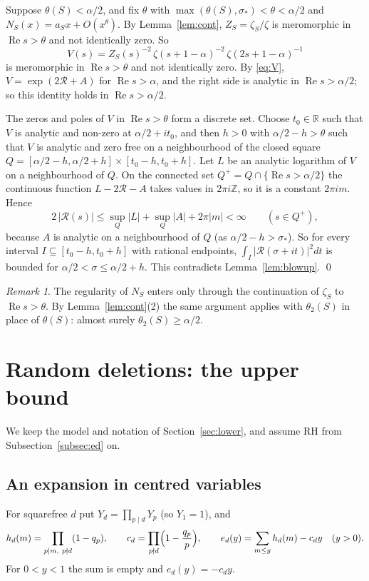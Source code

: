 \documentclass[11pt]{amsart}
\theoremstyle{remark}
\newtheorem{remark}[lemma]{Remark}
\numberwithin{equation}{section}
\newcommand{\R}{\mathbb{R}}
\newcommand{\Z}{\mathbb{Z}}
\newcommand{\cR}{\mathcal{R}}
\DeclareMathOperator{\re}{Re}
\begin{document}
Suppose $\theta(S)<\alpha/2$, and fix $\theta$ with $\max(\theta(S),\sigma_*)<\theta<\alpha/2$ and $N_S(x)=a_Sx+O(x^{\theta})$. By Lemma~\ref{lem:cont}, $Z_S=\zeta_S/\zeta$ is meromorphic in $\re s>\theta$ and not identically zero. So
\[
V(s)=Z_S(s)^{-2}\,\zeta(s+1-\alpha)^{-2}\,\zeta(2s+1-\alpha)^{-1}
\]
is meromorphic in $\re s>\theta$ and not identically zero. By \eqref{eq:V}, $V=\exp(2\cR+A)$ for $\re s>\alpha$, and the right side is analytic in $\re s>\alpha/2$; so this identity holds in $\re s>\alpha/2$.

The zeros and poles of $V$ in $\re s>\theta$ form a discrete set. Choose $t_0\in\R$ such that $V$ is analytic and non-zero at $\alpha/2+it_0$, and then $h>0$ with $\alpha/2-h>\theta$ such that $V$ is analytic and zero free on a neighbourhood of the closed square $Q=[\alpha/2-h,\alpha/2+h]\times[t_0-h,t_0+h]$. Let $L$ be an analytic logarithm of $V$ on a neighbourhood of $Q$. On the connected set $Q^+=Q\cap\{\re s>\alpha/2\}$ the continuous function $L-2\cR-A$ takes values in $2\pi i\Z$, so it is a constant $2\pi im$. Hence
\[
2\,|\cR(s)|\le\sup_Q|L|+\sup_Q|A|+2\pi|m|<\infty\qquad(s\in Q^+),
\]
because $A$ is analytic on a neighbourhood of $Q$ (as $\alpha/2-h>\sigma_*$). So for every interval $I\subseteq[t_0-h,t_0+h]$ with rational endpoints, $\int_I|\cR(\sigma+it)|^2dt$ is bounded for $\alpha/2<\sigma\le\alpha/2+h$. This contradicts Lemma~\ref{lem:blowup}. \qed

\begin{remark}\label{rem:lowertwo}
The regularity of $N_S$ enters only through the continuation of $\zeta_S$ to $\re s>\theta$. By Lemma~\ref{lem:cont}(2) the same argument applies with $\theta_2(S)$ in place of $\theta(S)$: almost surely $\theta_2(S)\ge\alpha/2$.
\end{remark}

\section{Random deletions: the upper bound}\label{sec:upper}

We keep the model and notation of Section~\ref{sec:lower}, and assume RH from Subsection~\ref{subsec:ed} on.

\subsection{An expansion in centred variables}
For squarefree $d$ put $Y_d=\prod_{p\mid d}Y_p$ (so $Y_1=1$), and
\[
h_d(m)=\prod_{p\mid m,\ p\nmid d}(1-q_p),\qquad c_d=\prod_{p\nmid d}\Bigl(1-\frac{q_p}{p}\Bigr),\qquad e_d(y)=\sum_{m\le y}h_d(m)-c_dy\quad(y>0).
\]
For $0<y<1$ the sum is empty and $e_d(y)=-c_dy$.
\end{document}
